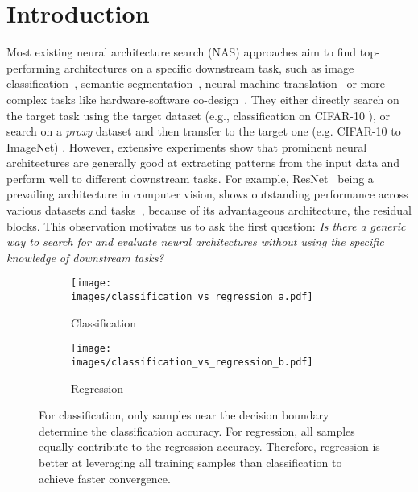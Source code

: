 \documentclass{article}
\begin{document}
\section{Introduction}
\label{sec:intro}

Most existing neural architecture search (NAS) approaches aim to find top-performing architectures on a specific downstream task, 
such as image classification~\cite{real2019regularized, zoph2016neural,liu2018darts,cai2018proxylessnas,su2021vision}, semantic segmentation~\cite{liu2019auto,nekrasov2019fast,shaw2019squeezenas}, neural machine translation~\cite{li2021bossnas,wang2020hat,so2019evolved} or more complex tasks like hardware-software co-design~\cite{hao2018deep,hao2019fpga,zhang2019skynet,lin2020mcunet,lin2021mcunetv2}.
They either directly search on the target task using the target dataset (e.g., classification on CIFAR-10 \cite{zoph2016neural,real2017large} ), or search on a \textit{proxy} dataset and then transfer to the target one (e.g. CIFAR-10 to ImageNet) \cite{zoph2018learning,liu2018darts}.
However, extensive experiments show that prominent neural architectures are generally good at extracting patterns from the input data and perform well to different downstream tasks. 
For example, ResNet~\cite{he2016deep} being a prevailing architecture in computer vision, shows outstanding performance across various datasets and tasks~\cite{chen2018encoder,marsden2017resnetcrowd,raghu2019transfusion}, because of its advantageous architecture, the residual blocks.
This observation motivates us to ask the first question: 
\textit{Is there a generic way to search for and evaluate neural architectures without using the specific knowledge of downstream tasks?}

\begin{figure}
\centering
     \begin{subfigure}[b]{0.48\textwidth}
         \centering
         \texttt{[image: images/classification\_vs\_regression\_a.pdf]}
         \caption{Classification}
         \label{fig:introA}
     \end{subfigure}
     \hfill
     \begin{subfigure}[b]{0.48\textwidth}
         \centering
         \texttt{[image: images/classification\_vs\_regression\_b.pdf]}
         \caption{Regression}
         \label{fig:introB}
     \end{subfigure}
     \hfill
        \caption{For classification, only  samples near the decision boundary determine the classification accuracy. For regression, all samples equally contribute to the regression accuracy. Therefore, regression is better at leveraging all  training samples than classification to achieve faster convergence.}
        \label{fig:classification_vs_regression}
        \vspace{-8pt}
\end{figure}
\end{document}
